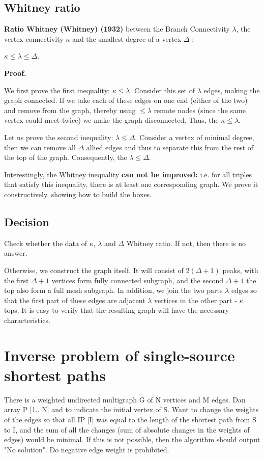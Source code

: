 \subsection{ Whitney ratio }

\textbf{Ratio Whitney (Whitney) (1932)} between the Branch Connectivity $\lambda$, the vertex connectivity $\kappa$ and the smallest degree of a vertex $\Delta$ :

$\kappa \le \lambda \le \Delta.$

\textbf{Proof.}

We first prove the first inequality: $\kappa \le \lambda$. Consider this set of $\lambda$ edges, making the graph connected. If we take each of these edges on one end (either of the two) and remove from the graph, thereby using $\le \lambda$ remote nodes (since the same vertex could meet twice) we make the graph disconnected. Thus, the $\kappa \le \lambda$.

Let us prove the second inequality: $\lambda \le \Delta$. Consider a vertex of minimal degree, then we can remove all $\Delta$ allied edges and thus to separate this from the rest of the top of the graph. Consequently, the $\lambda \le \Delta$.

Interestingly, the Whitney inequality \textbf{can not be improved:} i.e. for all triples that satisfy this inequality, there is at least one corresponding graph. We prove it constructively, showing how to build the boxes.

\subsection{ Decision }

Check whether the data of $\kappa$, $\lambda$ and $\Delta$ Whitney ratio. If not, then there is no answer.

Otherwise, we construct the graph itself. It will consist of $2 (\Delta + 1)$ peaks, with the first $\Delta + 1$ vertices form fully connected subgraph, and the second $\Delta + 1$ the top also form a full mesh subgraph. In addition, we join the two parts $\lambda$ edges so that the first part of these edges are adjacent $\lambda$ vertices in the other part - $\kappa$ tops. It is easy to verify that the resulting graph will have the necessary characteristics.

\section{ Inverse problem of single-source shortest paths }
There is a weighted undirected multigraph G of N vertices and M edges. Dan array P [1.. N] and to indicate the initial vertex of S. Want to change the weights of the edges so that all IP [I] was equal to the length of the shortest path from S to I, and the sum of all the changes (sum of absolute changes in the weights of edges) would be minimal. If this is not possible, then the algorithm should output "No solution". Do negative edge weight is prohibited.


